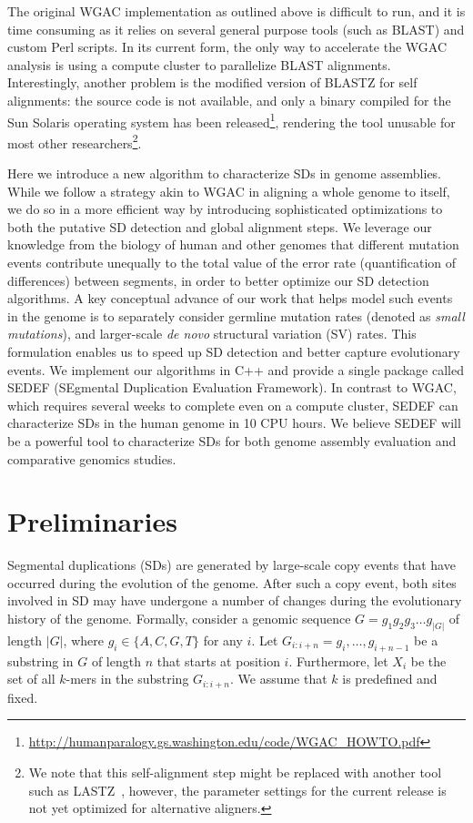 \documentclass{article}
\begin{document}
The original WGAC implementation as outlined above is difficult to run, and it is time consuming as it relies on several general purpose tools (such as BLAST) and custom Perl scripts. In its current form, the only way to accelerate the WGAC analysis is using a compute cluster to parallelize BLAST alignments. Interestingly, another problem is the modified version of BLASTZ for self alignments: the source code is not available, and only a binary compiled for the Sun Solaris operating system has been released\footnote{\href{http://humanparalogy.gs.washington.edu/code/WGAC\_HOWTO.pdf}{http://humanparalogy.gs.washington.edu/code/WGAC\_HOWTO.pdf}}, rendering the tool unusable for most other researchers\footnote{We note that this self-alignment step might be replaced with another tool such as LASTZ~\citep{Harris2007}, however, the parameter settings for the current release is not yet optimized for alternative aligners.}.

Here we introduce a new algorithm to characterize SDs in genome assemblies. While we follow a strategy akin to WGAC in aligning a whole genome to itself, we do so in a more efficient way by introducing sophisticated optimizations to both the putative SD detection and global alignment steps.
We leverage our knowledge from the biology of human and other genomes that different mutation events contribute unequally to the total value of the error rate (quantification of differences) between segments, in order to better optimize our SD detection algorithms.
A key conceptual advance of our work 
that helps model such events in the genome is to separately consider germline mutation rates (denoted as \emph{small mutations}), and larger-scale \textit{de novo} structural variation (SV) rates. This formulation enables us to speed up SD detection and better capture evolutionary events.
We implement our algorithms in C++ and provide a single package called SEDEF (SEgmental Duplication Evaluation Framework). In contrast to WGAC, which requires several weeks to complete even on a compute cluster, SEDEF can characterize SDs in the human genome in 10 CPU hours.
We believe SEDEF will be a powerful tool to characterize SDs for both genome assembly evaluation and comparative genomics studies.   


\section{Preliminaries}
Segmental duplications (SDs) are generated by large-scale copy events that have occurred during the 
evolution of the genome. After such a copy event, both sites involved in SD may have undergone a number
of changes during the evolutionary history of the genome. 
Formally, consider a genomic sequence $G=g_1g_2g_3\dots g_{|G|}$ of length $|G|$, where $g_i \in \{A, C, G, T\}$ for any $i$. 
Let $G_{i:i+n}=g_i,\dots,g_{i+n-1}$ 
be a substring in $G$ of length $n$ that starts at position $i$. 
Furthermore, let $X_i$ be the set of all  $k$-mers in the substring $G_{i:i+n}$. We assume that $k$ is predefined and fixed. 
\end{document}
